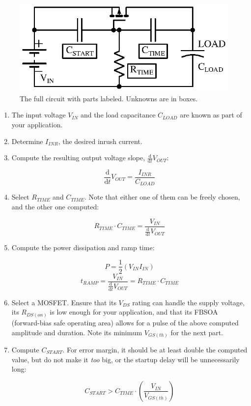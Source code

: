 \documentclass[letterpaper,12pt]{article}
\newcommand{\ddt}{\ensuremath{\frac{\mathrm{d}}{\mathrm{d}t}}}
\begin{document}
\begin{figure}[H]
\centering
\includegraphics{just_ckt_labeled}
\caption{The full circuit with parts labeled. Unknowns are in boxes.}
\end{figure}

\begin{enumerate}
\item{The input voltage $V_{IN}$ and the load capacitance $C_{LOAD}$ are known as part
    of your application.}
\item{Determine $I_{INR}$, the desired inrush current.}
\item{Compute the resulting output voltage slope, $\ddt V_{OUT}$:

    $$ \ddt V_{OUT} = \frac{I_{INR}}{C_{LOAD}} $$ }
\item{Select $R_{TIME}$ and $C_{TIME}$. Note that either one of them can be freely chosen,
    and the other one computed:

    $$ R_{TIME} \cdot C_{TIME} = \frac{V_{IN}}{\ddt V_{OUT}} $$ }
\item{Compute the power dissipation and ramp time:

    $$ P = \frac{1}{2}\left( V_{IN} I_{IN} \right) $$
    $$ t_{RAMP} = \frac{V_{IN}}{\ddt V_{OUT}} = R_{TIME} \cdot C_{TIME} $$ }
\item{Select a MOSFET. Ensure that its $V_{DS}$ rating can handle the supply voltage,
its $R_{DS(on)}$ is low enough for your application, and that its FBSOA (forward-bias safe
operating area) allows for a pulse of the above computed amplitude and duration. Note its
minimum $V_{GS(th)}$ for the next part.}

\item{Compute $C_{START}$. For error margin, it should be at least double the computed
value, but do not make it \emph{too} big, or the startup delay will be unnecessarily long:

    $$ C_{START} > C_{TIME} \cdot \left( \frac{V_{IN}}{V_{GS(th)}} \right) $$}

\end{enumerate}
\end{document}
